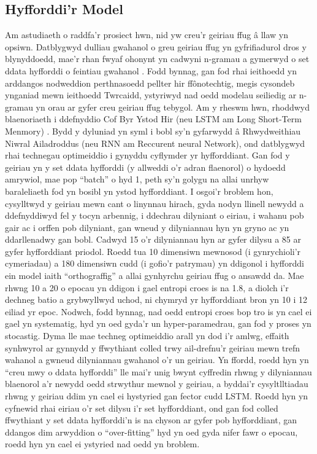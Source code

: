 \subsection{Hyfforddi'r Model}
Am astudiaeth o raddfa'r prosiect hwn, nid yw creu'r geiriau ffug â llaw yn opsiwn. Datblygwyd dulliau gwahanol o greu geiriau ffug yn gyfrifiadurol dros y blynyddoedd, mae'r rhan fwyaf ohonynt yn cadwyni n-gramau a gymerwyd o set ddata hyfforddi o feintiau gwahanol \parencite{new_unipseudo_2023, keuleers_wuggy_2010}. Fodd bynnag, gan fod rhai ieithoedd yn arddangos nodweddion perthnasoedd pellter hir ffônotechtig, megis cysondeb ynganiad mewn ieithoedd Twrcaidd, ystyriwyd nad oedd modelau seiliedig ar n-gramau yn orau ar gyfer creu geiriau ffug tebygol. Am y rheswm hwn, rhoddwyd blaenoriaeth i ddefnyddio Cof Byr Ystod Hir (neu LSTM am Long Short-Term Menmory) \parencite{hochreiter_long_1997}. Bydd y dyluniad yn syml i bobl sy'n gyfarwydd â Rhwydweithiau Niwral Ailadroddus (neu RNN am Reccurent neural Network), ond datblygwyd rhai technegau optimeiddio i gynyddu cyflymder yr hyfforddiant. Gan fod y geiriau yn y set ddata hyfforddi (y allweddi o'r adran flaenorol) o hydoedd amrywiol, mae pop ``batch'' o hyd 1, peth sy'n golygu na allai unrhyw baraleliaeth fod yn bosibl yn ystod hyfforddiant. I osgoi'r broblem hon, cysylltwyd y geiriau mewn cant o linynnau hirach, gyda nodyn llinell newydd a ddefnyddiwyd fel y tocyn arbennig, i ddechrau dilyniant o eiriau, i wahanu pob gair ac i orffen pob dilyniant, gan wneud y dilyniannau hyn yn gryno ac yn ddarllenadwy gan bobl. Cadwyd 15 o'r dilyniannau hyn ar gyfer dilysu a 85 ar gyfer hyfforddiant priodol. Roedd tua 10 dimensiwn mewnosod (i gynrychioli'r cymeriadau) a 180 dimensiwn cudd (i gofio'r patrymau) yn ddigonol i hyfforddi ein model iaith ``orthograffig'' a allai gynhyrchu geiriau ffug o ansawdd da. Mae rhwng 10 a 20 o epocau yn ddigon i gael entropi croes is na 1.8, a diolch i'r dechneg batio a grybwyllwyd uchod, ni chymryd yr hyfforddiant bron yn 10 i 12 eiliad yr epoc. Nodwch, fodd bynnag, nad oedd entropi croes bop tro is yn cael ei gael yn systematig, hyd yn oed gyda'r un hyper-paramedrau, gan fod y proses yn stocastig. Dyma lle mae techneg optimeiddio arall yn dod i'r amlwg, effaith synhwyrol ar gynnydd y ffwythiant colled trwy ail-drefnu'r geiriau mewn trefn wahanol a gwneud dilyniannau gwahanol o'r un geiriau. Yn ffordd, roedd hyn yn ``creu mwy o ddata hyfforddi'' lle mai'r unig bwynt cyffredin rhwng y dilyniannau blaenorol a'r newydd oedd strwythur mewnol y geiriau, a byddai'r cysyltlltiadau rhwng y geiriau ddim yn cael ei hystyried gan fector cudd LSTM. Roedd hyn yn cyfnewid rhai eiriau o'r set dilysu i'r set hyfforddiant, ond gan fod colled ffwythiant y set ddata hyfforddi'n is na chyson ar gyfer pob hyfforddiant, gan ddangos dim arwyddion o ``over-fitting'' hyd yn oed gyda nifer fawr o epocau, roedd hyn yn cael ei ystyried nad oedd yn broblem.

